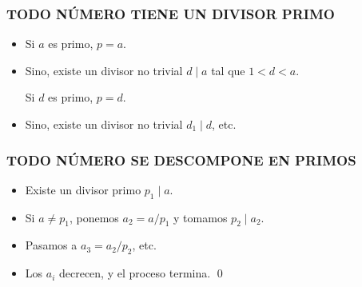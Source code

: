 \begin{frame}
  \frametitle{TODO NÚMERO TIENE UN DIVISOR PRIMO}



  \begin{itemize}
  \item<4-> Si $a$ es primo, $p = a$.

  \item<5-> Sino, existe un divisor no trivial $d \mid a$ tal que $1 < d < a$.

    Si $d$ es primo, $p = d$.

  \item<6-> Sino, existe un divisor no trivial $d_1 \mid d$, etc.
  \end{itemize}


\end{frame}

\begin{frame}
  \frametitle{TODO NÚMERO SE DESCOMPONE EN PRIMOS}



  \begin{itemize}
  \item<4-> Existe un divisor primo $p_1 \mid a$.

  \item<5-> Si $a \ne p_1$, ponemos $a_2 = a/p_1$ y tomamos $p_2 \mid a_2$.

  \item<6-> Pasamos a $a_3 = a_2/p_2$, etc.

  \item<7-> Los $a_i$ decrecen, y el proceso termina. \qed
  \end{itemize}
\end{frame}

